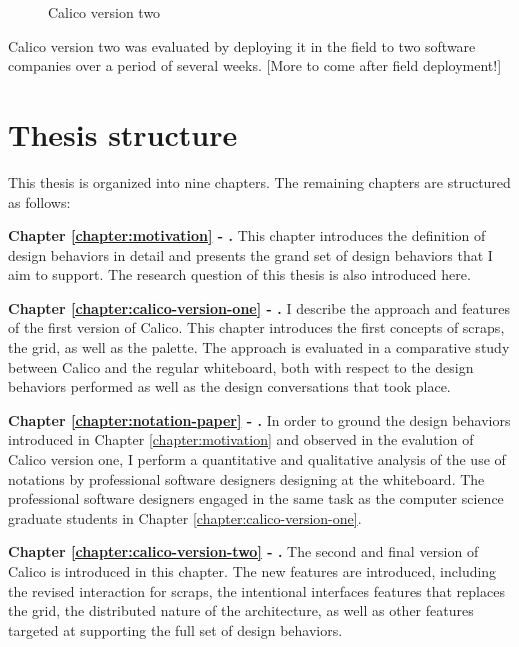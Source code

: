 \begin{figure}
  \centering
   \caption {Calico version two}
   \label{fig:calico-version-two}
\end{figure}

Calico version two was evaluated by deploying it in the field to two software companies over a period of several weeks. [More to come after field deployment!]

\section{Thesis structure}

This thesis is organized into nine chapters. The remaining chapters are structured as follows:

\textbf{Chapter \ref{chapter:motivation} - .} This chapter introduces the definition of design behaviors in detail and presents the grand set of design behaviors that I aim to support. The research question of this thesis is also introduced here.

\textbf{Chapter \ref{chapter:calico-version-one} - .} I describe the approach and features of the first version of Calico. This chapter introduces the first concepts of scraps, the grid, as well as the palette. The approach is evaluated in a comparative study between Calico and the regular whiteboard, both with respect to the design behaviors performed as well as the design conversations that took place.

\textbf{Chapter \ref{chapter:notation-paper} - .} In order to ground the design behaviors introduced in Chapter \ref{chapter:motivation} and observed in the evalution of Calico version one, I perform a quantitative and qualitative analysis of the use of notations by professional software designers designing at the whiteboard. The professional software designers engaged in the same task as the computer science graduate students in Chapter \ref{chapter:calico-version-one}.

\textbf{Chapter \ref{chapter:calico-version-two} - .} The second and final version of Calico is introduced in this chapter. The new features are introduced, including the revised interaction for scraps, the intentional interfaces features that replaces the grid, the distributed nature of the architecture, as well as other features targeted at supporting the full set of design behaviors.

